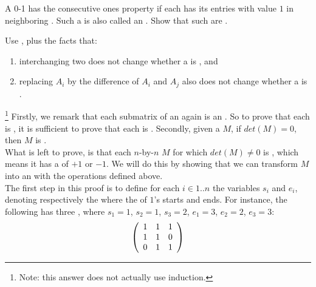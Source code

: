 \begin{exercise}
A 0-1  has the consecutive ones property if each  has its entries with value $1$ in neighboring . Such a  is also called an . Show that such  are .
\begin{hint}
Use , plus the facts that:
\begin{enumerate}
 \item interchanging two  does not change whether a  is , and
 \item replacing  $A_i$ by the difference of  $A_i$ and $A_j$ also does not change whether a  is .
\end{enumerate}
\end{hint}
\begin{answer}
\footnote{Note: this answer does not actually use induction.}
Firstly, we remark that each  submatrix of an  again is an . So to prove that each  is , it is sufficient to prove that each   is . Secondly, given a   $M$, if $det(M)=0$, then $M$ is .\\
What is left to prove, is that each $n$-by-$n$  $M$ for which $det(M)\neq 0$ is , which means it has a  of $+1$ or $-1$. We will do this by showing that we can transform $M$ into an  with the  operations defined above.\\
The first step in this proof is to define for each  $i \in 1..n$ the variables $s_i$ and $e_i$, denoting respectively the  where the  of $1$'s starts and ends. For instance, the following  has three , where $s_1=1$, $s_2=1$, $s_3=2$, $e_1=3$, $e_2=2$, $e_3=3$:
\begin{equation}
\label{unimodular_interval}
\left( \begin{array}{ccc}
1&1&1\\
1&1&0\\
0&1&1
\end{array} \right)
\end{equation}

\end{answer}
\end{exercise}
